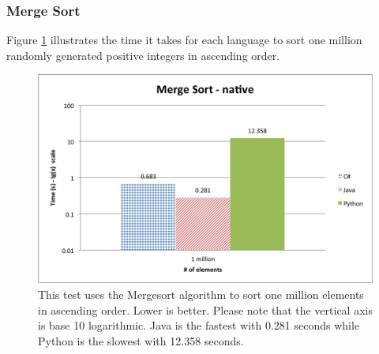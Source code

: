 \subsubsection{Merge Sort}

Figure \ref{fig:native_merge_sort} illustrates the time it takes for each language to sort one million randomly generated positive integers in ascending order.

\begin{figure}[h]
	\centering
	\includegraphics[width=1.0\linewidth]{chapters/new_media/MergeSortNative.png}
	\caption{This test uses the Mergesort algorithm to sort one million elements in ascending order. Lower is better. Please note that the vertical axis is base 10 logarithmic. Java is the fastest with 0.281 seconds while Python is the slowest with 12.358 seconds.}
	\label{fig:native_merge_sort}
\end{figure}
